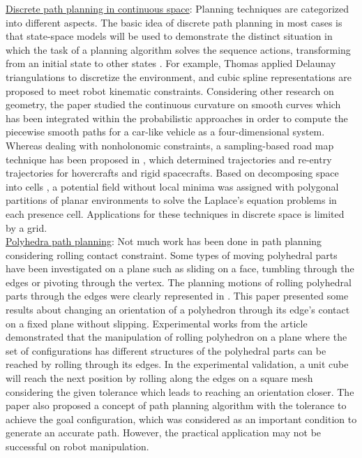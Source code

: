 \noindent \uline{Discrete path planning in continuous space}:
Planning techniques are categorized into different aspects. 
The basic idea of discrete path planning in most cases is that state-space models will be used to demonstrate the distinct situation in which the task of a planning algorithm solves the sequence actions, transforming from an initial state to other states \cite{Lavalle98rapidly_exploringrandom}. 
For example, Thomas \cite{Thomas_2003_Trajectory} applied Delaunay triangulations to discretize the environment, and cubic spline representations are proposed to meet robot kinematic constraints.
Considering other research on geometry, the paper \cite{Lamiraux_2001_Smooth_MP} studied the continuous curvature on smooth curves which has been integrated within the probabilistic approaches in order to compute the piecewise smooth paths for a car-like vehicle as a four-dimensional system. 
Whereas dealing with nonholonomic constraints, a sampling-based road map technique has been proposed in \cite{Cheng01_RRT-BasedTrajectory}, which determined trajectories and re-entry trajectories for hovercrafts and rigid spacecrafts. 
Based on decomposing space into cells \cite{Conner03_LocalFunction_Nagivation}, a potential field without local minima was assigned with polygonal partitions of planar environments to solve the Laplace’s equation problems in each presence cell. 
Applications for these techniques in discrete space is limited by a grid.\\

\noindent \uline{Polyhedra path planning}:
Not much work has been done in path planning considering rolling contact constraint. Some types of moving polyhedral parts have been investigated on a plane such as sliding on a face, tumbling through the edges or pivoting \cite{Aiyama93_Pivoting} through the vertex. 
The planning motions of rolling polyhedral parts through the edges were clearly represented in \cite{Marigo97_PolyhedraManipulation_rolling}. 
This paper presented some results about changing an orientation of a polyhedron through its edge's contact on a fixed plane without slipping.
Experimental works from the article demonstrated that the manipulation of rolling polyhedron on a plane where the set of configurations has different structures of the polyhedral parts can be reached by rolling through its edges. 
In the experimental validation, a unit cube will reach the next position by rolling  along the edges on a square mesh considering the given tolerance which leads to reaching an orientation closer. 
The paper also proposed a concept of path planning algorithm with the tolerance to achieve the goal configuration, which was considered as an important condition to generate an accurate path.
However, the practical application may not be successful on robot manipulation.\\

